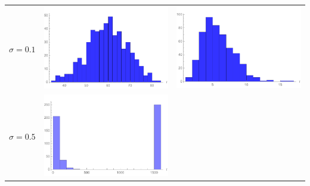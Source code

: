 \begin{table}[!htb]
\begin{tabular}{c|c|c}
\begin{minipage}{.45\textwidth}
		\end{minipage}
		\\ \hline
		$\sigma=0.1$ & 
		\begin{minipage}{.45\textwidth}
			\includegraphics[width=\linewidth]{StopTime/x001o1.pdf}
		\end{minipage}
		& \begin{minipage}{.45\textwidth}
			\includegraphics[width=\linewidth]{StopTime/x01o1.pdf}
		\end{minipage}
		\\ \hline
		$\sigma=0.5$ & \begin{minipage}{.45\textwidth}
			\includegraphics[width=\linewidth]{StopTime/x001o5.pdf}

\end{minipage}
\end{tabular}
\end{table}
